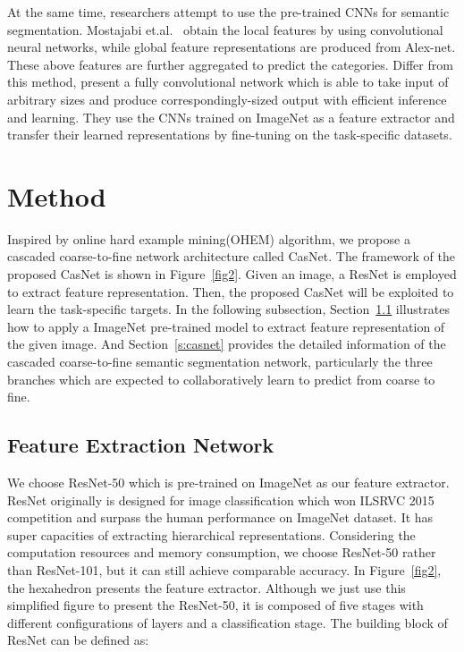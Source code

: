 \documentclass[10.5pt,compsoc]{TsT}
\newcommand{\upcite}[1]{\superscript{\textsuperscript{\cite{#1}}}}
\theoremstyle{mystyle}
\newcommand{\upcite}[1]{\textsuperscript{\cite{#1}}}
\begin{document}
{At the same time, researchers attempt to use the pre-trained CNNs for semantic segmentation. Mostajabi et.al.~\upcite{17} obtain the local features by using convolutional neural networks, while  global feature representations are produced from Alex-net. These above features are further aggregated to predict the categories. Differ from this method, \cite{19} present a fully convolutional network which is able to take input of arbitrary sizes and produce correspondingly-sized output with efficient inference and learning. They use the CNNs trained on ImageNet as a feature extractor and transfer their learned representations by fine-tuning on the task-specific datasets.

\section{Method}
\label{s:Method}
\noindent


Inspired by online hard example mining(OHEM) algorithm, we propose a cascaded coarse-to-fine network architecture called CasNet. The framework of the proposed CasNet is shown in Figure~\ref{fig2}. Given an image, a ResNet is employed to extract feature representation. Then, the proposed CasNet will be exploited to learn the task-specific targets. In the following subsection, Section~\ref{s:feature} illustrates how to apply a ImageNet pre-trained model to extract feature representation of the given image. And Section~\ref{s:casnet} provides the detailed information of the cascaded coarse-to-fine semantic segmentation network, particularly the three branches which are expected to collaboratively learn to predict from coarse to fine.


\subsection{Feature Extraction Network}
\label{s:feature}
\noindent

We choose ResNet-50 which is pre-trained on ImageNet as our feature extractor. ResNet originally is designed for image classification which won ILSRVC 2015 competition and surpass the human performance on ImageNet dataset. It has super capacities of extracting hierarchical representations. Considering the computation resources and memory consumption, we choose ResNet-50 rather than ResNet-101, but it can still achieve comparable accuracy. In Figure~\ref{fig2}, the hexahedron presents the feature extractor. Although we just use this simplified figure to present the ResNet-50, it is composed of five stages with different configurations of layers and a classification stage. The building block of ResNet can be defined as:

}
\end{document}
